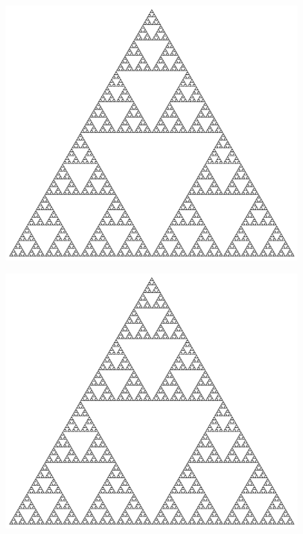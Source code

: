 \begin{figure}[h]
    \centering
    \begin{minipage}{.5\textwidth}
      \centering
      \includegraphics[width=.8\linewidth]{imatges/sierpinski.jpg}
      \label{fig:Julia_example_}
    \end{minipage}%
    \begin{minipage}{.5\textwidth}
      \centering
      \includegraphics[width=.8\linewidth]{imatges/sierpinski.jpg}
      \label{fig:Julia_example_}
    \end{minipage}
\end{figure}
\noindent
